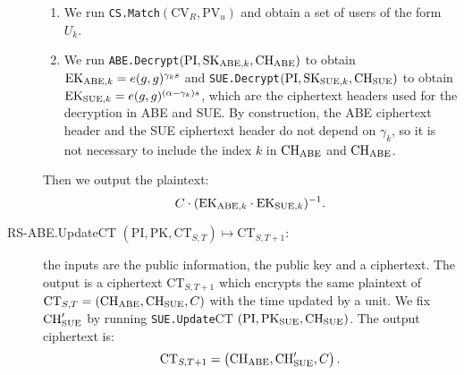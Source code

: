 \documentclass[a4paper,10pt]{article}
\newcommand{\mapssingleoutput}[2]{$ \left( #1 \right) \mapsto #2 $}
\newcommand{\algorithm}[2]{\texttt{#1.#2}}
\newcommand{\algorithmdefsingleoutput}[4]{\item[#1.#2 \mapssingleoutput{#3}{#4}:] }
\begin{document}
\begin{description}
	\begin{enumerate}
		\item
		We run \algorithm{CS}{Match}$(\mathit{\mathrm{CV}}_R,\mathit{\mathrm{PV}}_u)$ and obtain a set of users of the form $U_k$.
		\item
		We run \algorithm{ABE}{Decrypt}$(\mathit{\mathrm{PI}},\mathit{\mathrm{SK}}_{\textnormal{ABE},k},\mathit{\mathrm{CH}}_{\textnormal{ABE}})$ to obtain $\mathit{\mathrm{EK}}_{\textnormal{ABE},k}=e(g,g)^{\gamma_k s}$ and  \algorithm{SUE}{Decrypt}$(\mathit{\mathrm{PI}},\mathit{\mathrm{SK}}_{\textnormal{SUE},k},\mathit{\mathrm{CH}}_{\textnormal{SUE}})$ to obtain $\mathit{\mathrm{EK}}_{\textnormal{SUE},k}=e(g,g)^{(\alpha  - \gamma_k) s}$, which are the ciphertext headers used for the decryption in ABE and SUE. By construction,  the ABE ciphertext header and the SUE ciphertext header do not depend on $\gamma_k$, so it is not necessary to include the index $k$ in $\mathit{\mathrm{CH}}_{\textnormal{ABE}}$ and $\mathit{\mathrm{CH}}_{\textnormal{ABE}}$.
	\end{enumerate}
	Then we output the plaintext:
	\[
		C\cdot (\mathit{\mathrm{EK}}_{\textnormal{ABE},k}\cdot \mathit{\mathrm{EK}}_{\textnormal{SUE},k})^{-1}.
	\]
	
	\algorithmdefsingleoutput{RS-ABE}{Update$\mathrm{CT}$}{\mathit{\mathrm{PI}},\mathit{\mathrm{PK}},\mathrm{CT}_{S,T}}{\mathrm{CT}_{S,T+1}} the inputs are the public information, the public key and a ciphertext.
	The output is a ciphertext $\mathrm{CT}_{S,T+1}$ which encrypts the same plaintext of $\mathrm{CT}_{S,T}=\left( \mathrm{CH}_{\textnormal{ABE}}, \mathrm{CH}_{\textnormal{SUE}}, C \right)$ with the time updated by a unit.
	We fix $\mathrm{CH}^{\prime}_{\textnormal{SUE}}$ by running \linebreak \algorithm{SUE}{Update$\mathrm{CT}$}
	$(\mathit{\mathrm{PI}},\mathit{\mathrm{PK}}_{\textnormal{SUE}}, \mathrm{CH}_{\textnormal{SUE}})$.
	The output ciphertext is:
	\[
		\mathrm{CT}_{S,T+1}=\left( \mathrm{CH}_{\textnormal{ABE}},\mathrm{CH}^{\prime}_{\textnormal{SUE}}, C\right).
	\]
	
\end{description}
	
\end{document}
